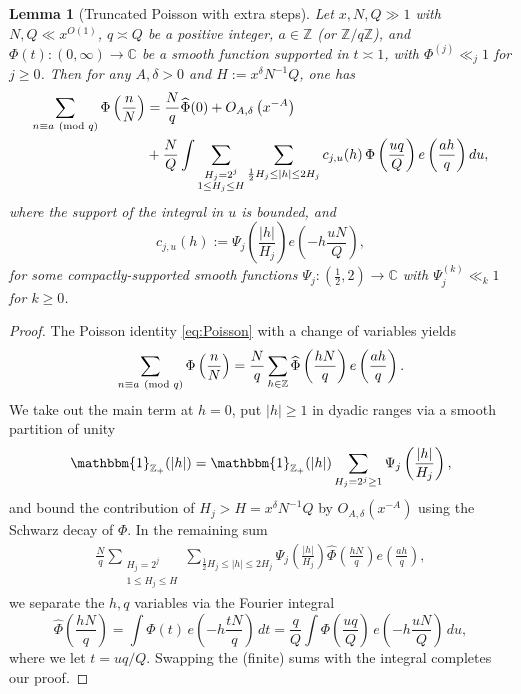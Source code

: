 \documentclass[reqno,11pt]{amsart}
\newtheorem{lemma}[theorem]{Lemma}
\theoremstyle{remark}
\numberwithin{equation}{section}
\newcommand{\Z}{\mathbb{Z}}
\newcommand{\C}{\mathbb{C}}
\newcommand{\one}{\mathbbm{1}}
\renewcommand{\hat}{\widehat}
\renewcommand{\pmod}[1]{\ (\textnormal{mod } #1)}
\begin{document}
\begin{lemma}[Truncated Poisson with extra steps] \label{lem:truncated-poisson}
Let $x, N, Q \gg 1$ with $N, Q \ll x^{O(1)}$, $q \asymp Q$ be a positive integer, $a \in \Z$ (or $\Z/q\Z$), and $\Phi(t) : (0, \infty) \to \C$ be a smooth function supported in $t \asymp 1$, with $\Phi^{(j)} \ll_j 1$ for $j \ge 0$. Then for any $A, \delta > 0$ and $H := x^\delta N^{-1} Q$, one has
\[
\begin{aligned}
    \sum_{n \equiv a \pmod{q}} \Phi\left(\frac{n}{N}\right)
    &=
    \frac{N}{q} \hat{\Phi}(0)
    +
    O_{A,\delta}\left(x^{-A}\right)
    \\
    &+
    \frac{N}{Q} \int \sum_{\substack{H_j = 2^j \\ 1 \le H_j \le H}}
    \sum_{\frac{1}{2} H_j \le |h| \le 2H_j}
    c_{j,u}(h)\,
    \Phi\left(\frac{uq}{Q}\right) e\left(\frac{ah}{q}\right) du,
\end{aligned}
\]
where the support of the integral in $u$ is bounded, and
\begin{equation} \label{eq:h-coeffs-poisson}
    c_{j,u}(h) := \Psi_j\left(\frac{|h|}{H_j}\right) e\left(-h \frac{uN}{Q} \right),
\end{equation}
for some compactly-supported smooth functions $\Psi_j : (\frac{1}{2}, 2) \to \C$ with $\Psi_j^{(k)} \ll_k 1$ for $k \ge 0$.
\end{lemma}

\begin{proof}
The Poisson identity \cref{eq:Poisson} with a change of variables yields
\[
    \sum_{n \equiv a \pmod{q}} \Phi\left(\frac{n}{N}\right)
    =
    \frac{N}{q} \sum_{h \in \Z} \hat{\Phi}\left(\frac{hN}{q}\right) 
    e\left(\frac{ah}{q}\right).
\]
We take out the main term at $h = 0$, put $|h| \ge 1$ in dyadic ranges via a smooth partition of unity
\[
    \one_{\Z_+}(|h|) = \one_{\Z_+}(|h|) \sum_{H_j = 2^j \ge 1} \Psi_j\left(\frac{|h|}{H_j}\right),
\]
and bound the contribution of $H_j > H = x^\delta N^{-1} Q$ by $O_{A,\delta}(x^{-A})$ using the Schwarz decay of $\Phi$. In the remaining sum
\[
\begin{aligned}
    \frac{N}{q} \sum_{\substack{H_j = 2^j \\ 1 \le H_j \le H}}
    \sum_{\frac{1}{2}H_j \le |h| \le 2H_j}
    \Psi_j\left(\frac{|h|}{H_j}\right) \hat{\Phi}\left(\frac{hN}{q}\right)
    e\left(\frac{ah}{q}\right),
\end{aligned}
\]
we separate the $h, q$ variables via the Fourier integral
\[
    \hat{\Phi}\left(\frac{hN}{q}\right) = \int \Phi(t)\, e\left(-h \frac{tN}{q}\right)\, dt
    =
    \frac{q}{Q} \int \Phi\left(\frac{uq}{Q}\right)\, e\left(-h \frac{uN}{Q}\right)\, du,
\]
where we let $t = uq/Q$. Swapping the (finite) sums with the integral completes our proof.
\end{proof}
\end{document}
